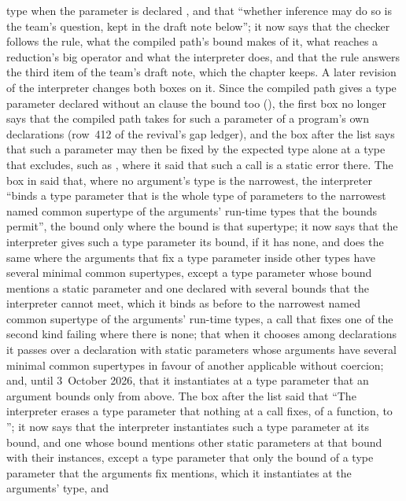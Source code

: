\begin{description}
type when the parameter is declared , and that
``whether inference may do so is the team's question, kept in the draft note
below''; it now says that the checker follows the rule, what the compiled path's
bound  makes of it, what reaches a reduction's big operator and what
the interpreter does, and that the rule answers the third item of the team's
draft note, which the chapter keeps.
A later revision of the interpreter changes both boxes on it.
Since the compiled path gives a type parameter declared without an
 clause the bound  too (), the first
box no longer says that the compiled path takes  for such a
parameter of a program's own declarations (row~412 of the revival's gap ledger),
and the box after the list says that such a parameter may then be fixed by the
expected type alone at a type that  excludes, such as \TYP{()},
where it said that such a call is a static error there.
The box in  said that, where no argument's type is
the narrowest, the interpreter ``binds a type parameter that is the whole type
of parameters to the narrowest named common supertype of the arguments'
run-time types that the bounds permit'', the bound only where the bound is that
supertype; it now says that the interpreter gives such a type parameter its
bound,  if it has none, and does the same where the arguments that fix
a type parameter inside other types have several minimal common supertypes,
except a type parameter whose bound mentions a static parameter and one
declared with several bounds that the interpreter cannot meet, which it binds as
before to the narrowest named common supertype of the arguments' run-time
types, a call that fixes one of the second kind failing where there is none;
that when it chooses among declarations it passes over a declaration with
static parameters whose arguments have several minimal common supertypes in
favour of another applicable without coercion; and, until 3~October 2026, that
it instantiates at  a type parameter that an argument bounds
only from above.
The box after the list said that ``The interpreter erases a type parameter that
nothing at a call fixes, of a function, to ''; it now says that
the interpreter instantiates such a type parameter at its bound, and one whose
bound mentions other static parameters at that bound with their instances,
except a type parameter that only the bound of a type parameter that the
arguments fix mentions, which it instantiates at the arguments' type, and

\end{description}
